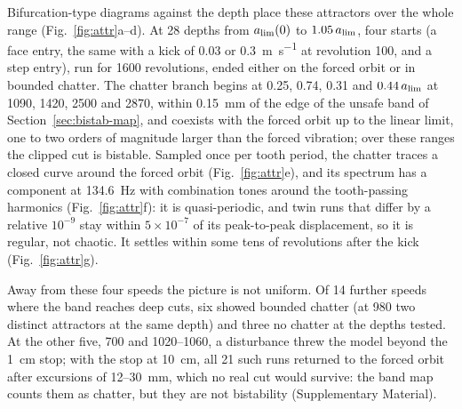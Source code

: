 Bifurcation-type diagrams against the depth place these attractors over the whole range (Fig.~\ref{fig:attr}a--d). At 28 depths from $a_{\lim}(0)$ to $1.05\,a_{\lim}$, four starts (a face entry, the same with a kick of 0.03 or \SI{0.3}{\metre\per\second} at revolution 100, and a step entry), run for 1600 revolutions, ended either on the forced orbit or in bounded chatter. The chatter branch begins at 0.25, 0.74, 0.31 and $0.44\,a_{\lim}$ at 1090, 1420, 2500 and \SI{2870}{\rpm}, within \SI{0.15}{\milli\metre} of the edge of the unsafe band of Section~\ref{sec:bistab-map}, and coexists with the forced orbit up to the linear limit, one to two orders of magnitude larger than the forced vibration; over these ranges the clipped cut is bistable. Sampled once per tooth period, the chatter traces a closed curve around the forced orbit (Fig.~\ref{fig:attr}e), and its spectrum has a component at \SI{134.6}{\hertz} with combination tones around the tooth-passing harmonics (Fig.~\ref{fig:attr}f): it is quasi-periodic, and twin runs that differ by a relative $10^{-9}$ stay within $5\times10^{-7}$ of its peak-to-peak displacement, so it is regular, not chaotic. It settles within some tens of revolutions after the kick (Fig.~\ref{fig:attr}g).

Away from these four speeds the picture is not uniform. Of 14 further speeds where the band reaches deep cuts, six showed bounded chatter (at \SI{980}{\rpm} two distinct attractors at the same depth) and three no chatter at the depths tested. At the other five, 700 and 1020--\SI{1060}{\rpm}, a disturbance threw the model beyond the \SI{1}{\centi\metre} stop; with the stop at \SI{10}{\centi\metre}, all 21 such runs returned to the forced orbit after excursions of 12--\SI{30}{\milli\metre}, which no real cut would survive: the band map counts them as chatter, but they are not bistability (Supplementary Material).

